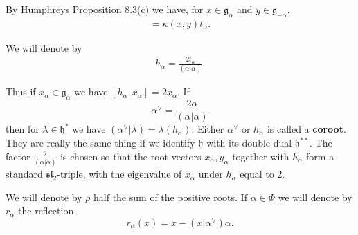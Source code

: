 \documentclass[12pt]{article}
\begin{document}
By Humphreys Proposition 8.3(c) we have, for $x \in \mathfrak{g}_\alpha$ and $y \in \mathfrak{g}_{-\alpha}$,
\begin{align*}
    [x,y] = \kappa(x,y)t_\alpha.
\end{align*}

We will denote by
\begin{align*}
    h_\alpha = \frac{2t_\alpha}{(\alpha|\alpha)}.
\end{align*}

Thus if $x_\alpha \in \mathfrak{g}_\alpha$ we have $[h_\alpha, x_\alpha] = 2x_\alpha$. If
\[
    \alpha^\vee = \frac{2\alpha}{(\alpha|\alpha)}
\]
then for $\lambda \in \mathfrak{h}^*$ we have $(\alpha^\vee | \lambda) = \lambda(h_\alpha)$. Either $\alpha^\vee$ or $h_\alpha$ is called a \textbf{coroot}. They are really the same thing if we identify $\mathfrak{h}$ with its double dual $\mathfrak{h}^{**}$. The factor $\tfrac{2}{(\alpha|\alpha)}$ is chosen so that the root vectors $x_\alpha, y_\alpha$ together with $h_\alpha$ form a standard $\mathfrak{sl}_2$-triple, with the eigenvalue of $x_\alpha$ under $h_\alpha$ equal to $2$.

We will denote by $\rho$ half the sum of the positive roots. If $\alpha \in \Phi$ we will denote by $r_\alpha$ the reflection
\[
    r_\alpha(x) = x - (x|\alpha^\vee)\alpha.
\]
\end{document}
